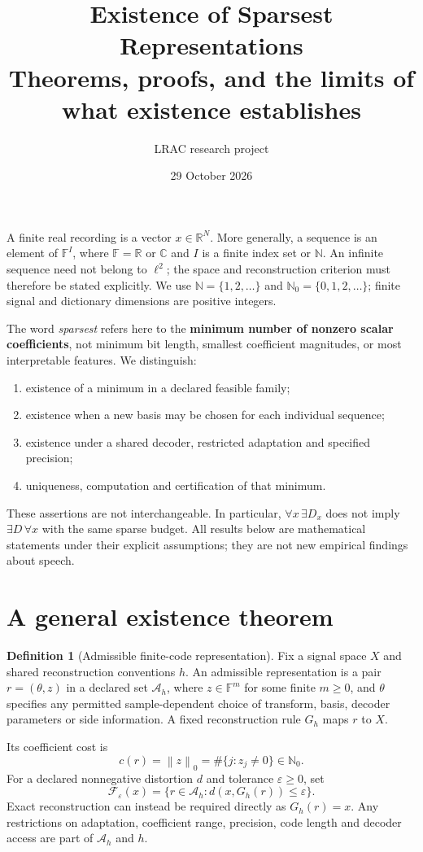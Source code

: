 \documentclass[11pt,a4paper]{article}
\title{Existence of Sparsest Representations\\[5pt]\large Theorems, proofs, and the limits of what existence establishes}
\author{LRAC research project}
\date{29 October 2026}
\theoremstyle{definition}
\newtheorem{definition}{Definition}
\theoremstyle{remark}
\newcommand{\R}{\mathbb R}
\newcommand{\C}{\mathbb C}
\newcommand{\F}{\mathbb F}
\newcommand{\N}{\mathbb N}
\newcommand{\norm}[1]{\left\lVert#1\right\rVert}
\begin{document}
\maketitle



A finite real recording is a vector $x\in\R^N$. More generally, a sequence is an
element of $\F^I$, where $\F=\R$ or $\C$ and $I$ is a finite index set or $\N$.
An infinite sequence need not belong to $\ell^2$; the space and reconstruction
criterion must therefore be stated explicitly.
We use $\N=\{1,2,\ldots\}$ and $\N_0=\{0,1,2,\ldots\}$; finite signal and
dictionary dimensions are positive integers.

The word \emph{sparsest} refers here to the \textbf{minimum number of nonzero
scalar coefficients}, not minimum bit length, smallest coefficient magnitudes,
or most interpretable features. We distinguish:
\begin{enumerate}
\item existence of a minimum in a declared feasible family;
\item existence when a new basis may be chosen for each individual sequence;
\item existence under a shared decoder, restricted adaptation and specified precision;
\item uniqueness, computation and certification of that minimum.
\end{enumerate}
These assertions are not interchangeable. In particular,
$\forall x\,\exists D_x$ does not imply $\exists D\,\forall x$ with the same sparse
budget. All results below are mathematical statements under their explicit
assumptions; they are not new empirical findings about speech.

\section{A general existence theorem}

\begin{definition}[Admissible finite-code representation]\label{def:admissible}
Fix a signal space $X$ and shared reconstruction conventions $h$. An admissible
representation is a pair $r=(\theta,z)$ in a declared set $\mathcal A_h$, where
$z\in\F^m$ for some finite $m\geq0$, and $\theta$ specifies any permitted
sample-dependent choice of transform, basis, decoder parameters or side
information. A fixed reconstruction rule $G_h$ maps $r$ to $X$.

Its coefficient cost is
\[
c(r)=\norm{z}_0=\#\{j:z_j\neq0\}\in\N_0.
\]
For a declared nonnegative distortion $d$ and tolerance $\varepsilon\geq0$, set
\[
\mathcal F_\varepsilon(x)
=\{r\in\mathcal A_h:d(x,G_h(r))\leq\varepsilon\}.
\]
Exact reconstruction can instead be required directly as $G_h(r)=x$.
Any restrictions on adaptation, coefficient range, precision, code length and
decoder access are part of $\mathcal A_h$ and $h$.
\end{definition}
\end{document}
